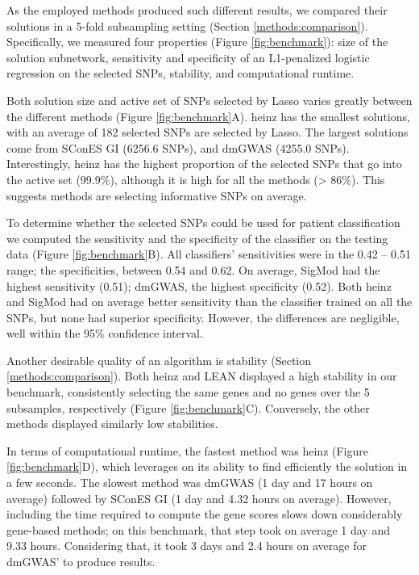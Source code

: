 \documentclass[
  11pt,
]{env/yjiao}
\begin{document}
As the employed methods produced such different results, we compared
their solutions in a 5-fold subsampling setting (Section
\ref{methods:comparison}). Specifically, we measured
four properties (Figure \ref{fig:benchmark}):
size of the solution subnetwork,
sensitivity and specificity of an L1-penalized logistic regression on
the selected SNPs, stability, and computational runtime.

Both solution size and active set of SNPs selected by Lasso varies
greatly between the different methods (Figure \ref{fig:benchmark}A).
heinz has the smallest solutions, with an
average of 182 selected SNPs are selected by
Lasso. The largest solutions come from SConES GI (6256.6 SNPs), and
dmGWAS (4255.0 SNPs). Interestingly, heinz has the highest proportion of
the selected SNPs that go into the active set (99.9\%), although it is
high for all the methods (\textgreater{} 86\%). This suggests methods are selecting
informative SNPs on average.

To determine whether the selected SNPs could be used for patient
classification we computed the sensitivity and the specificity of the
classifier on the testing data (Figure \ref{fig:benchmark}B).
All classifiers' sensitivities were in the
0.42 -- 0.51 range; the specificities, between 0.54 and 0.62. On
average, SigMod had the highest sensitivity (0.51); dmGWAS, the highest
specificity (0.52). Both heinz and SigMod had on average better
sensitivity than the classifier trained on all the SNPs, but none had
superior specificity. However, the differences are negligible, well
within the 95\% confidence interval.

Another desirable quality of an algorithm is stability (Section
\ref{methods:comparison}). Both heinz and LEAN displayed a high
stability in our benchmark, consistently selecting the same genes and no
genes over the 5 subsamples, respectively (Figure \ref{fig:benchmark}C).
Conversely, the other methods displayed similarly low stabilities.

In terms of computational runtime, the fastest method was heinz (Figure
\ref{fig:benchmark}D), which leverages on its ability to find
efficiently the solution in a few seconds. The slowest method was dmGWAS
(1 day and 17 hours on average) followed by SConES GI (1 day and 4.32
hours on average). However, including the time required to compute the gene
scores slows down considerably gene-based methods; on this
benchmark, that step took on average 1 day and 9.33 hours. Considering
that, it took 3 days and 2.4 hours on average for dmGWAS' to produce
results.
\end{document}
